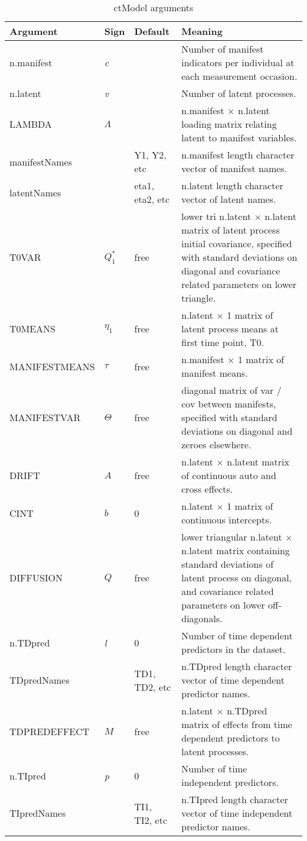 \documentclass[11pt]{article}\usepackage[]{graphicx}\usepackage[]{color}
\begin{document}
\begin{table}\footnotesize
\caption{ctModel arguments} \label{tab:ctmodel}
\begin{tabular}{l|l|l p{8cm} }
\textbf{Argument} & \textbf{Sign} & \textbf{Default} & \textbf{Meaning}\\
\hline
 n.manifest & \textit{c} & & Number of manifest indicators per individual at each measurement occasion.\\
 n.latent & \textit{v} & & Number of latent processes.\\
 LAMBDA & $\Lambda$& & n.manifest $\times$ n.latent loading matrix relating latent to manifest variables.\\
 manifestNames & & Y1, Y2, etc & n.manifest length character vector of manifest names.\\
 latentNames & & eta1, eta2, etc & n.latent length character vector of latent names.\\
 T0VAR & $Q^*_1$ & free & lower tri n.latent $\times$ n.latent matrix of latent process initial covariance, specified with standard deviations on diagonal and covariance related parameters on lower triangle.\\
 T0MEANS & $\eta_1$ & free & n.latent $\times$ 1 matrix of latent process means at first time point, T0.\\
 MANIFESTMEANS & $\tau$ & free & n.manifest $\times$ 1 matrix of manifest means.\\
 MANIFESTVAR & $\Theta$ & free & diagonal matrix of var / cov between manifests, specified with standard deviations on diagonal and zeroes elsewhere.\\
 DRIFT & $A$ & free & n.latent $\times$ n.latent matrix of continuous auto and cross effects.\\
 CINT & $b$ & 0 & n.latent $\times$ 1 matrix of continuous intercepts.\\
 DIFFUSION & $Q$ & free & lower triangular n.latent $\times$ n.latent matrix containing standard deviations of latent process on diagonal, and covariance related parameters on lower off-diagonals.\\
 n.TDpred & \textit{l} & 0 & Number of time dependent predictors in the dataset.\\
 TDpredNames & & TD1, TD2, etc & n.TDpred length character vector of time dependent predictor names.\\
 TDPREDEFFECT & $M$ & free & n.latent $\times$ n.TDpred matrix of effects from time dependent predictors to latent processes.\\
 n.TIpred & \textit{p} & 0 & Number of time independent predictors.\\
 TIpredNames & & TI1, TI2, etc & n.TIpred length character vector of time independent predictor names.\\
\end{tabular}
\end{table}
\end{document}

